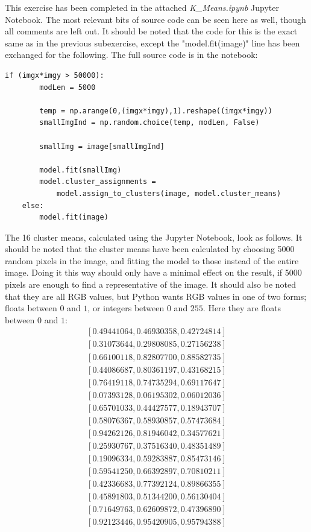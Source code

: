 This exercise has been completed in the attached \textit{K\_Means.ipynb} Jupyter Notebook. The most relevant bits of source code can be seen here as well, though all comments are left out. It should be noted that the code for this is the exact same as in the previous subexercise, except the "model.fit(image)" line has been exchanged for the following. The full source code is in the notebook:
\begin{verbatim}
if (imgx*imgy > 50000):
        modLen = 5000

        temp = np.arange(0,(imgx*imgy),1).reshape((imgx*imgy))
        smallImgInd = np.random.choice(temp, modLen, False)
        
        smallImg = image[smallImgInd]

        model.fit(smallImg)
        model.cluster_assignments = 
            model.assign_to_clusters(image, model.cluster_means)
    else:
        model.fit(image)
\end{verbatim}
The 16 cluster means, calculated using the Jupyter Notebook, look as follows. It should be noted that the cluster means have been calculated by choosing 5000 random pixels in the image, and fitting the model to those instead of the entire image. Doing it this way should only have a minimal effect on the result, if 5000 pixels are enough to find a representative of the image. It should also be noted that they are all RGB values, but Python wants RGB values in one of two forms; floats between $0$ and $1$, or integers between $0$ and $255$. Here they are floats between $0$ and $1$:\\
$$
\begin{matrix}
[0.49441064, 0.46930358, 0.42724814] \\[3pt]
[0.31073644, 0.29808085, 0.27156238] \\[3pt]
[0.66100118, 0.82807700, 0.88582735] \\[3pt]
[0.44086687, 0.80361197, 0.43168215] \\[3pt]
[0.76419118, 0.74735294, 0.69117647] \\[3pt]
[0.07393128, 0.06195302, 0.06012036] \\[3pt]
[0.65701033, 0.44427577, 0.18943707] \\[3pt]
[0.58076367, 0.58930857, 0.57473684] \\[3pt]
[0.94262126, 0.81946042, 0.34577621] \\[3pt]
[0.25930767, 0.37516340, 0.48351489] \\[3pt]
[0.19096334, 0.59283887, 0.85473146] \\[3pt]
[0.59541250, 0.66392897, 0.70810211] \\[3pt]
[0.42336683, 0.77392124, 0.89866355] \\[3pt]
[0.45891803, 0.51344200, 0.56130404] \\[3pt]
[0.71649763, 0.62609872, 0.47396890] \\[3pt]
[0.92123446, 0.95420905, 0.95794388]
\end{matrix}
$$
